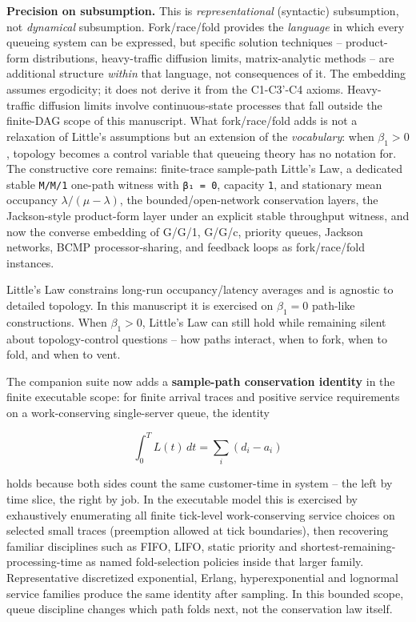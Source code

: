 \documentclass[
  11pt,
]{article}
\begin{document}
\textbf{Precision on subsumption.} This is \emph{representational}
(syntactic) subsumption, not \emph{dynamical} subsumption.
Fork/race/fold provides the \emph{language} in which every queueing
system can be expressed, but specific solution techniques --
product-form distributions, heavy-traffic diffusion limits,
matrix-analytic methods -- are additional structure \emph{within} that
language, not consequences of it. The embedding assumes ergodicity; it
does not derive it from the C1-C3'-C4 axioms. Heavy-traffic diffusion
limits involve continuous-state processes that fall outside the
finite-DAG scope of this manuscript. What fork/race/fold adds is not a
relaxation of Little's assumptions but an extension of the
\emph{vocabulary}: when \(\beta_1 > 0\), topology becomes a control
variable that queueing theory has no notation for. The constructive core
remains: finite-trace sample-path Little's Law, a dedicated stable
\texttt{M/M/1} one-path witness with \texttt{β₁\ =\ 0}, capacity
\texttt{1}, and stationary mean occupancy \(\lambda / (\mu - \lambda)\),
the bounded/open-network conservation layers, the Jackson-style
product-form layer under an explicit stable throughput witness, and now
the converse embedding of G/G/1, G/G/c, priority queues, Jackson
networks, BCMP processor-sharing, and feedback loops as fork/race/fold
instances.

Little's Law constrains long-run occupancy/latency averages and is
agnostic to detailed topology. In this manuscript it is exercised on
\(\beta_1 = 0\) path-like constructions. When \(\beta_1 > 0\), Little's
Law can still hold while remaining silent about topology-control
questions -- how paths interact, when to fork, when to fold, and when to
vent.

The companion suite now adds a \textbf{sample-path conservation
identity} in the finite executable scope: for finite arrival traces and
positive service requirements on a work-conserving single-server queue,
the identity

\[
\int_0^T L(t)\,dt = \sum_i (d_i - a_i)
\]

holds because both sides count the same customer-time in system -- the
left by time slice, the right by job. In the executable model this is
exercised by exhaustively enumerating all finite tick-level
work-conserving service choices on selected small traces (preemption
allowed at tick boundaries), then recovering familiar disciplines such
as FIFO, LIFO, static priority and shortest-remaining-processing-time as
named fold-selection policies inside that larger family. Representative
discretized exponential, Erlang, hyperexponential and lognormal service
families produce the same identity after sampling. In this bounded
scope, queue discipline changes which path folds next, not the
conservation law itself.
\end{document}
